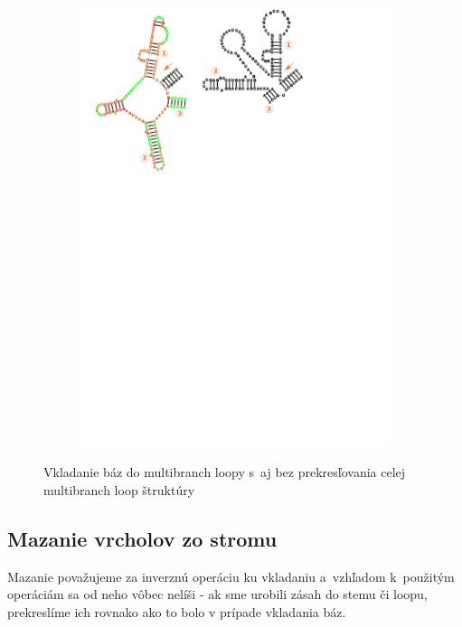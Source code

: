 \begin{figure}[t!]
\begin{subfigure}[t]{\wi}
    \includegraphics[clip, trim=1cm 18cm 13cm 0, width=1\textwidth]{../img/alg/insert/multibranch-redraw}
  \end{subfigure}

  \caption{Vkladanie báz do multibranch loopy s~aj bez prekresľovania celej multibranch loop štruktúry}
  \label{obr:insert_multibranch}
\end{figure}





\subsection{Mazanie vrcholov zo stromu}

Mazanie považujeme za inverznú operáciu ku vkladaniu a~vzhľadom k~použitým operáciám
sa od neho vôbec nelíši - ak sme urobili zásah do stemu či loopu, prekreslíme
ich rovnako ako to bolo v prípade vkladania báz.




